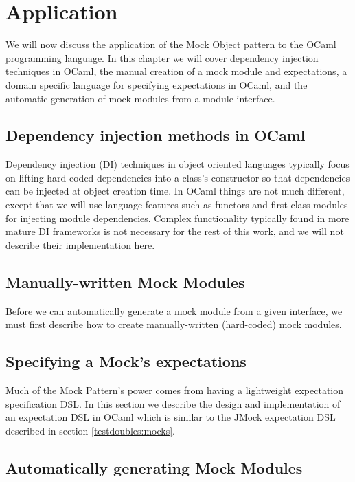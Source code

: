 \chapter{Application}
\label{application}

We will now discuss the application of the Mock Object pattern to the
OCaml programming language. In this chapter we will cover dependency
injection techniques in OCaml, the manual creation of a mock module
and expectations, a domain specific language for specifying
expectations in OCaml, and the automatic generation of mock modules
from a module interface.

\section{Dependency injection methods in OCaml}
\label{application:di}

Dependency injection (DI) techniques in object oriented languages
typically focus on lifting hard-coded dependencies into a class's
constructor so that dependencies can be injected at object creation
time. In OCaml things are not much different, except that we will use
language features such as functors and first-class modules for
injecting module dependencies. Complex functionality typically found
in more mature DI frameworks is not necessary for the rest of this
work, and we will not describe their implementation here.

\section{Manually-written Mock Modules}
\label{application:manual-mock}

Before we can automatically generate a mock module from a given
interface, we must first describe how to create manually-written
(hard-coded) mock modules.

\section{Specifying a Mock's expectations}
\label{application:expectations}

Much of the Mock Pattern's power comes from having a lightweight
expectation specification DSL. In this section we describe the design
and implementation of an expectation DSL in OCaml which is similar to
the JMock expectation DSL described in section
\ref{testdoubles:mocks}.

\section{Automatically generating Mock Modules}
\label{application:generation}

